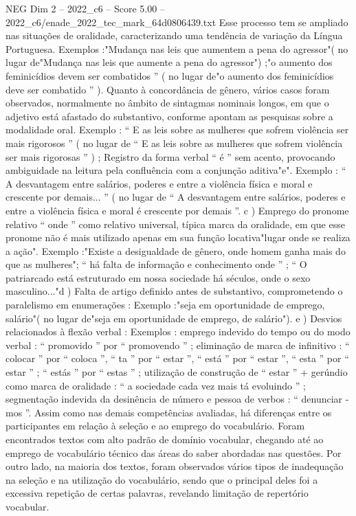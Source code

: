 \begin{textsample}{NEG Dim 2 – 2022\_c6 – Score 5.00 – 2022\_c6/enade\_2022\_tec\_mark\_64d0806439.txt}
Esse processo tem se ampliado nas situações de oralidade, caracterizando uma tendência de variação da Língua Portuguesa.
Exemplos :"Mudança nas leis que aumentem a pena do agressor"( no lugar de"Mudança nas leis que aumente a pena do agressor") ;"o aumento dos feminicídios devem ser combatidos ” ( no lugar de"o aumento dos feminicídios deve ser combatido ” ).
Quanto à concordância de gênero, vários casos foram observados, normalmente no âmbito de sintagmas nominais longos, em que o adjetivo está afastado do substantivo, conforme apontam as pesquisas sobre a modalidade oral.
Exemplo : “ E as leis sobre as mulheres que sofrem violência ser mais rigorosos ” ( no lugar de “ E as leis sobre as mulheres que sofrem violência ser mais rigorosas ” ) ; Registro da forma verbal “ é ” sem acento, provocando ambiguidade na leitura pela confluência com a conjunção aditiva"e".
Exemplo : “ A desvantagem entre salários, poderes e entre a violência física e moral e crescente por demais... ” ( no lugar de “ A desvantagem entre salários, poderes e entre a violência física e moral é crescente por demais ”. c ) Emprego do pronome relativo “ onde ” como relativo universal, típica marca da oralidade, em que esse pronome não é mais utilizado apenas em sua função locativa"lugar onde se realiza a ação".
Exemplo :"Existe a desigualdade de gênero, onde homem ganha mais do que as mulheres"; “ há falta de informação e conhecimento onde ” ; “ O patriarcado está estruturado em nossa sociedade há séculos, onde o sexo masculino..."d ) Falta de artigo definido antes de substantivo, comprometendo o paralelismo em enumerações : Exemplo :"seja em oportunidade de emprego, salário"( no lugar de"seja em oportunidade de emprego, de salário"). e ) Desvios relacionados à flexão verbal : Exemplos : emprego indevido do tempo ou do modo verbal : “ promovido ” por “ promovendo ” ; eliminação de marca de infinitivo : “ colocar ” por “ coloca ”, “ ta ” por “ estar ”, “ está ” por “ estar ”, “ esta ” por “ estar ” ; “ estás ” por “ estas ” ; utilização de construção de “ estar ” + gerúndio como marca de oralidade : “ a sociedade cada vez mais tá evoluindo ” ; segmentação indevida da desinência de número e pessoa de verbos : “ denunciar -mos ”.
Assim como nas demais competências avaliadas, há diferenças entre os participantes em relação à seleção e ao emprego do vocabulário.
Foram encontrados textos com alto padrão de domínio vocabular, chegando até ao emprego de vocabulário técnico das áreas do saber abordadas nas questões.
Por outro lado, na maioria dos textos, foram observados vários tipos de inadequação na seleção e na utilização do vocabulário, sendo que o principal deles foi a excessiva repetição de certas palavras, revelando limitação de repertório vocabular.

\end{textsample}
